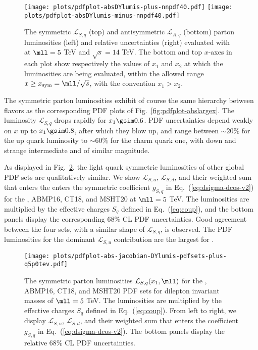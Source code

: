 \begin{figure}[!t]
 \centering
 \texttt{[image: plots/pdfplot-absDYlumis-plus-nnpdf40.pdf]}
 \texttt{[image: plots/pdfplot-absDYlumis-minus-nnpdf40.pdf]}
 \caption{The symmetric $\mathcal{L}_{S,q}$ (top)
   and antisymmetric $\mathcal{L}_{A,q}$ (bottom)
   parton
   luminosities (left) and relative uncertainties (right) evaluated with
    \nnlo at $\mll=5$ TeV and $\sqrt{s}=14$ TeV.
The bottom  and top $x$-axes in each plot show respectively the values
of $x_1$ and $x_2$  at which the
luminosities are being evaluated, within the allowed range
$x \ge x_{\rm sym}=\mll/\sqrt{s}$, with the convention $x_1>x_2$.}    
 \label{fig:pdfplot-absDYlumis-plus-nnpdf40}
\end{figure}

The symmetric parton luminosities exhibit of course the same hierarchy
between flavors
as the corresponding PDF plots of Fig.~\ref{fig:pdfplot-abslargex}. 
%
The luminosity $\mathcal{L}_{S,q}$  drops rapidly for
$x_1\gsim 0.6$. PDF  uncertainties  depend weakly on  $x$
up to $x_1\gsim 0.8$, after which they blow up, and range between $\sim 20\%$
for the up quark luminosity to $\sim 60\%$ for the charm quark one,
with down and strange intermediate and of similar magnitude.

As displayed in Fig.~\ref{fig:mll_dep_lumi_plus}, the light quark symmetric luminosities of other global PDF sets
are qualitatively similar.
%
We show $\mathcal{L}_{S,u}$,  $\mathcal{L}_{S,d}$,
and their weighted sum that enters the  enters the
symmetric coefficient $g_{S,q}$ in Eq.~(\ref{eq:dsigma-dcos-v2})
for the , ABMP16,
CT18, and MSHT20 at $\mll=5$ TeV.
%
The luminosities are multiplied by the effective charges
$S_q$ defined in Eq.~(\ref{eq:coup}),
and the bottom panels display the corresponding 68\% CL PDF uncertainties.
%
Good agreement between the four sets, with a similar shape
of $\mathcal{L}_{S,q}$, is observed.
%
The PDF luminosities for the dominant $\mathcal{L}_{S,u}$ contribution are the largest for .

\begin{figure}[!t]
 \centering
 \texttt{[image: plots/pdfplot-abs-jacobian-DYlumis-pdfsets-plus-q5p0tev.pdf]}
  \caption{The symmetric 
   parton luminosities $\mathcal{L}_{S,q}(x_1,\mll)$ for the , ABMP16,
   CT18, and MSHT20 \nnlo PDF sets for dilepton
   invariant masses of $\mll=5$ TeV.
   The luminosities are multiplied by the effective charges
   $S_q$ defined in Eq.~(\ref{eq:coup}).
   From left to right, we display $\mathcal{L}_{S,u}$,  $\mathcal{L}_{S,d}$,
   and their weighted sum that enters the  coefficient $g_{S,q}$ in Eq.~(\ref{eq:dsigma-dcos-v2}).
   The bottom panels display the relative 68\% CL PDF uncertainties.
    }    
 \label{fig:mll_dep_lumi_plus}
\end{figure}

